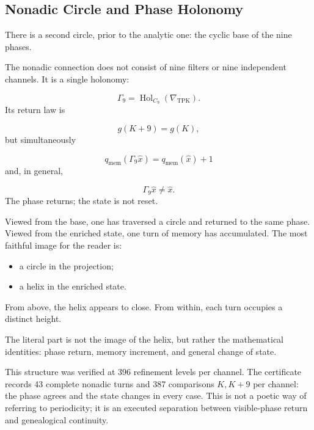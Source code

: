 \subsection{Nonadic Circle and Phase Holonomy}
There is a second circle, prior to the analytic one: the cyclic base of the nine phases.\par
The nonadic connection does not consist of nine filters or nine independent channels. It is a single holonomy:\par
\[
\Gamma_9
=
\operatorname{Hol}_{C_9}
(\nabla_{\mathrm{TPK}}).
\]
Its return law is\par
\[
g(K+9)=g(K),
\]
but simultaneously\par
\[
q_{\mathrm{mem}}
(\Gamma_9\widehat x)
=
q_{\mathrm{mem}}(\widehat x)+1
\]
and, in general,\par
\[
\Gamma_9\widehat x
\neq
\widehat x.
\]
The phase returns; the state is not reset.\par
Viewed from the base, one has traversed a circle and returned to the same phase. Viewed from the enriched state, one turn of memory has accumulated. The most faithful image for the reader is:\par
\begin{itemize}
\item a circle in the projection;
\item a helix in the enriched state.
\end{itemize}
From above, the helix appears to close. From within, each turn occupies a distinct height.\par
The literal part is not the image of the helix, but rather the mathematical identities: phase return, memory increment, and general change of state.\par
This structure was verified at 396 refinement levels per channel. The certificate records 43 complete nonadic turns and 387 comparisons \(K,K+9\) per channel: the phase agrees and the state changes in every case. This is not a poetic way of referring to periodicity; it is an executed separation between visible-phase return and genealogical continuity.\par
{}
